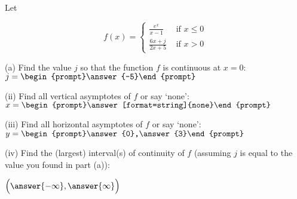 \documentclass{ximera}
\author{Tom Dinitz and Nela Lakos}
\begin{document}
\begin{exercise}

Let 

\[
f(x)=
\begin{cases}
\frac{e^x}{x-1} & \text{ if } x\leq 0\\
\frac{6x+j}{2x+5} & \text{ if } x>0
\end{cases}
\]

(a) Find the value $j$ so that the function $f$ is continuous at $x=0$: $j=\begin{prompt}\answer{-5}\end{prompt}$

(ii) Find all vertical asymptotes of $f$ or say `none': $x=\begin{prompt}\answer[format=string]{none}\end{prompt}$

(iii) Find all horizontal asymptotes of $f$ or say `none': $y=\begin{prompt}\answer{0},\answer{3}\end{prompt}$

(iv) Find the (largest) interval(s) of continuity of $f$ (assuming $j$ is equal to the value you found in part (a)): 
\begin{prompt}
$\Big(\answer{-\infty},\answer{\infty}\Big)$
\end{prompt}

\end{exercise}
\end{document}
